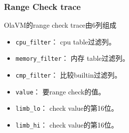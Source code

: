 %
%
%

\subsubsection{Range Check trace}\label{subsubsec: olavm-trace-range-check}
OlaVM的range check trace由6列组成
\begin{itemize}
    \item \verb|cpu_filter|： cpu table过滤列。
    \item \verb|memory_filter|： 内存 table过滤列。
    \item \verb|cmp_filter|： 比较builtin过滤列。
    \item \verb|value|： 要range check的值。
    \item \verb|limb_lo|： check value的第16位。
    \item \verb|limb_hi|： check value的第16位。
\end{itemize}

